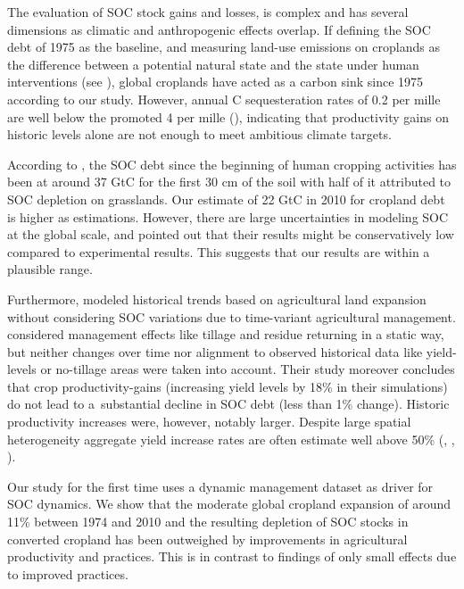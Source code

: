 \documentclass[gc, manuscript]{copernicus}
\begin{document}
The evaluation of SOC stock gains and losses, is complex and has several dimensions as climatic and anthropogenic effects overlap. If defining the SOC debt of 1975 as the baseline, and measuring land-use emissions on croplands as the difference between a potential natural state and the state under human interventions (see \citep{pugh_simulated_2015}), global croplands have acted as a carbon sink since 1975 according to our study. However, annual C sequesteration rates of 0.2 per mille are well below the promoted 4 per mille (\citep{minasny_soil_2017}), indicating that productivity gains on historic levels alone are not enough to meet ambitious climate targets.

According to \citep{sanderman_soil_2017}, the SOC debt since the beginning of human cropping activities has been at around 37 GtC for the first 30 cm of the soil with half of it attributed to SOC depletion on grasslands. Our estimate of 22 GtC in 2010 for cropland debt is higher as \citep{sanderman_soil_2017} estimations. However, there are large uncertainties in modeling SOC at the global scale, and \citep{sanderman_soil_2017} pointed out that their results might be conservatively low compared to experimental results. This suggests that our results are within a plausible range.

Furthermore, \citep{sanderman_soil_2017} modeled historical trends based on agricultural land expansion without considering SOC variations due to time-variant agricultural management. \citep{pugh_simulated_2015} considered management effects like tillage and residue returning in a static way, but neither changes over time nor alignment to observed historical data like yield-levels or no-tillage areas were taken into account. Their study moreover concludes that crop productivity-gains (increasing yield levels by 18\% in their simulations) do not lead to a~substantial decline in SOC debt (less than 1\% change). Historic productivity increases were, however, notably larger. Despite large spatial heterogeneity aggregate yield increase rates are often estimate well above 50\% (\citep{pellegrini_crop_2018}, \citep{ray_recent_2012}, \citep{rudel_agricultural_2009}).

Our study for the first time uses a dynamic management dataset as driver for SOC dynamics. We show that the moderate global cropland expansion of around 11\% between 1974 and 2010 and the resulting depletion of SOC stocks in converted cropland has been outweighed by improvements in agricultural productivity and practices. This is in contrast to \citep{pugh_simulated_2015} findings of only small effects due to improved practices.
\end{document}
